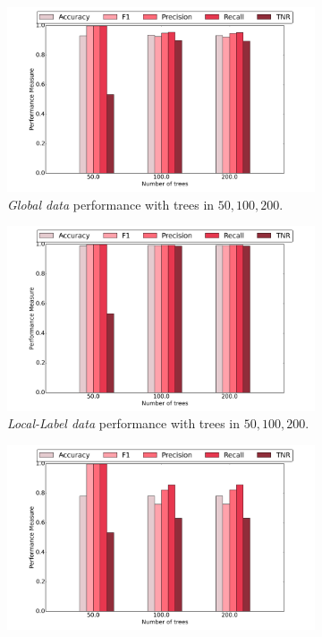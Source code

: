 \documentclass{sig-alternate-05-2015}
\begin{document}
\begin{figure}[t]
\centering
\begin{subfigure}{.4\textwidth}
\centering
\includegraphics[scale=0.2]{figures/2Map-globalPerf.png}
\caption{\textit{Global data} performance with trees in ${50,100,200}$.}
\end{subfigure}
\begin{subfigure}{.4\textwidth}
\centering
\includegraphics[scale=0.2]{figures/2Map-localLabelPerf.png}
\caption{\textit{Local-Label data} performance with trees in ${50,100,200}$.}
\end{subfigure}
\begin{subfigure}{.4\textwidth}
\centering
\includegraphics[scale=0.2]{figures/2Map-localFeatureLabelPerf.png}

\end{subfigure}
\end{figure}
\end{document}
